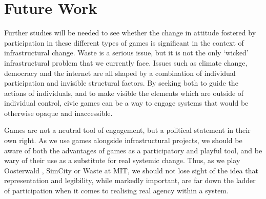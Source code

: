 \documentclass[nofonts,nols,justified,nobib]{tufte-book}
\begin{document}
\newpage

\section*{Future Work}
Further studies will be needed to see whether the change in attitude fostered by participation in these different types of games is significant in the context of infrastructural change. Waste is a serious issue, but it is not the only `wicked' infrastructural problem that we currently face. Issues such as climate change, democracy and the internet are all shaped by a combination of individual participation and invisible structural factors. By seeking both to guide the actions of individuals, and to make visible the elements which are outside of individual control, civic games can be a way to engage systems that would be otherwise opaque and inaccessible.

Games are not a neutral tool of engagement, but a political statement in their own right. As we use games alongside infrastructural projects, we should be aware of both the advantages of games as a participatory and playful tool, and be wary of their use as a substitute for real systemic change. Thus, as we play Oosterwald \cite{play_the_city_play_2013}, SimCity or Waste at MIT, we should not lose sight of the idea that representation and legibility, while markedly important, are far down the ladder of participation when it comes to realising real agency within a system.

 
\end{document}
